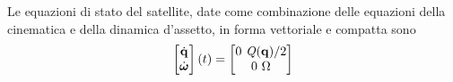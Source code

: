 Le equazioni di stato del satellite, date come combinazione delle equazioni
della cinematica e della dinamica d'assetto, in forma vettoriale e compatta sono
\begin{equation}
\begin{bmatrix}
\dot{\mathit{\bf q}}\\\dot{\boldsymbol \omega}
\end{bmatrix}(t) =
\begin{bmatrix}
0 \ \mathit{Q}(\mathit{\bf q})/2 \\
0 \ \Omega
\end{bmatrix} 
\end{equation}

